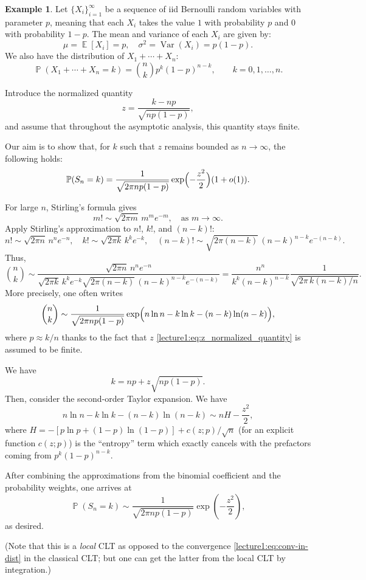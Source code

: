 \documentclass[letterpaper,11pt,oneside,reqno]{book}
\numberwithin{equation}{chapter}  %
\theoremstyle{definition}
\newtheorem{example}[proposition]{Example}
\begin{document}
\begin{example}
Let $\{X_i\}_{i=1}^{\infty}$ be a sequence of iid Bernoulli random variables with parameter $p$, meaning that each $X_i$ takes the value $1$ with probability $p$ and $0$ with probability $1 - p$. The mean and variance of each $X_i$ are given by:
\[
	\mu = \operatorname{\mathbb{E}}[X_i] = p, \quad \sigma^2 = \operatorname{\mathrm{Var}}(X_i) = p(1 - p).
\]
We also have the distribution of $X_1+\cdots+X_n$:
\begin{equation*}
	\operatorname{\mathbb{P}}\left( X_1+ \cdots + X_n = k \right) = \binom{n}{k} p^k (1-p)^{n-k},
	\qquad k = 0, 1, \ldots, n.
\end{equation*}

Introduce the normalized quantity
\begin{equation}
	\label{lecture1:eq:z_normalized_quantity}
	z = \frac{k - np}{\sqrt{np(1-p)}},
\end{equation}
and assume that throughout the asymptotic analysis,
this quantity stays finite.

Our aim is to show that, for $k$ such that $z$ remains bounded as $n\to\infty$, the following holds:
\[
\operatorname{\mathbb{P}}(S_n = k) = \frac{1}{\sqrt{2\pi np(1-p)}} \exp\Bigl( -\frac{z^2}{2} \Bigr) (1+o(1)).
\]

For large $n$, Stirling's formula gives
\[
m! \sim \sqrt{2\pi m}\, m^m e^{-m}, \quad \text{as } m\to\infty.
\]
Apply Stirling's approximation to $n!$, $k!$, and $(n-k)!$:
\[
n! \sim \sqrt{2\pi n}\, n^n e^{-n}, \quad
k! \sim \sqrt{2\pi k}\, k^k e^{-k}, \quad
(n-k)! \sim \sqrt{2\pi (n-k)}\,(n-k)^{n-k} e^{-(n-k)}.
\]
Thus,
\[
\binom{n}{k} \sim \frac{\sqrt{2\pi n}\, n^n e^{-n}}{\sqrt{2\pi k}\, k^k e^{-k}\sqrt{2\pi (n-k)}\,(n-k)^{n-k} e^{-(n-k)}}
= \frac{n^n}{k^k (n-k)^{n-k}}
\frac{1}{\sqrt{2\pi\, k(n-k)/n}}.
\]
More precisely, one often writes
\[
\binom{n}{k} \sim \frac{1}{\sqrt{2\pi np(1-p)}} \exp\Bigl( n\ln n - k\ln k - (n-k)\ln (n-k) \Bigr),
\]
where $p\approx k/n$ thanks to the fact that
$z$ \eqref{lecture1:eq:z_normalized_quantity} is assumed to be finite.

We have
\[
k = np+ z\sqrt{np(1-p)}.
\]
Then, consider the second-order Taylor expansion. We have
\[
n\ln n - k\ln k - (n-k)\ln (n-k) \sim n H -\frac{z^2}{2},
\]
where $H=-[p\ln p+(1-p)\ln(1-p)]+c(z;p)/\sqrt n$
(for an explicit function $c(z;p)$)
is the
``entropy'' term which exactly cancels with the prefactors coming from $p^k (1-p)^{n-k}$.

After combining the approximations from the binomial coefficient and the probability weights, one arrives at
\[
\operatorname{\mathbb{P}}(S_n = k)
\sim \frac{1}{\sqrt{2\pi np(1-p)}} \exp\left( -\frac{z^2}{2} \right),
\]
as desired.


(Note that this is a \emph{local} CLT as opposed to the convergence
\eqref{lecture1:eq:conv-in-dist} in the classical CLT; but one can get the latter
from the local CLT by integration.)

\end{example}
\end{document}
